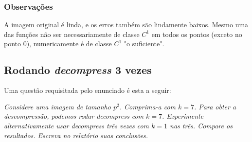 \documentclass{article}
\begin{document}
\subsubsection{Observações}

A imagem original é linda, e os erros também são lindamente baixos. Mesmo uma
das funções não ser necessariamente de classe $C^1$ em todos os pontos
(exceto no ponto 0), numericamente é de classe $C^1$ "o suficiente".

\subsection{Rodando \textit{decompress} 3 vezes}

Uma questão requisitada pelo enunciado é esta a seguir:

\textit{Considere uma imagem de tamanho $p^2$. Comprima-a com $k = 7$.
Para obter a descompressão, podemos rodar decompress com $k = 7$.
Experimente alternativamente usar decompress três vezes com $k = 1$ nas
três. Compare os resultados. Escreva no relatório suas conclusões.}
\end{document}
